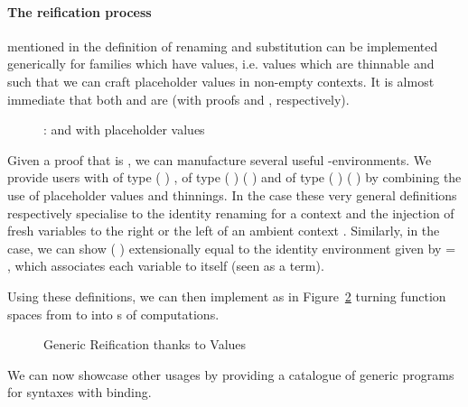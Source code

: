 \paragraph{The reification process} mentioned in the definition of renaming
and substitution can be implemented generically for \semrec{} families
which have  values, i.e.  values which are thinnable and
such that we can craft placeholder values in non-empty contexts. It is
almost immediate that both  and  are  (with
proofs  and ,
respectively).

\begin{figure}[h]
\caption{:  and with placeholder values\label{fig:VarLike}}
\end{figure}

\label{sec:varlike:base}
Given a proof that  is , we can manufacture
several useful -environments. We provide users with
 of type {( )  },
 of type
{( )  ( \AF{++} )}
and  of type
{( )  ( \AF{++} )}
by combining the use of placeholder values and thinnings.
%
In the  case these very general definitions respectively specialise
to the identity renaming for a context  and the injection of 
fresh variables to the right or the left of an ambient context .
%
Similarly, in the  case, we can show
{( )}
extensionally equal to the identity environment 
given by {  = },
which associates each variable to itself (seen as a term).

Using these definitions, we can then implement  as in
Figure~\ref{fig:kripkereify} turning  function spaces
from  to  into s of  computations.

\begin{figure}[h]
\caption{Generic Reification thanks to  Values%
\label{fig:kripkereify}}
\end{figure}

We can now showcase other usages by providing a catalogue of generic programs
for syntaxes with binding.



